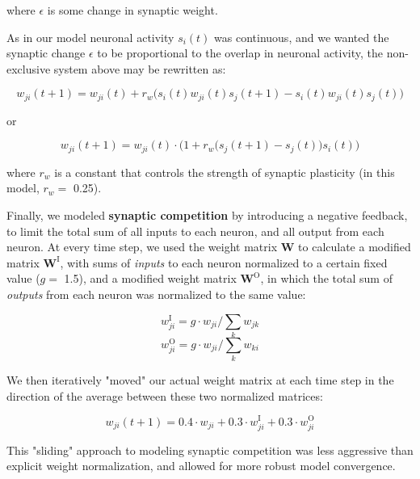\documentclass{article}
\begin{document}
where $\epsilon$ is some change in synaptic weight. 

As in our model neuronal activity $s_i(t)$ was continuous, and we wanted the synaptic change $\epsilon$ to be proportional to the overlap in neuronal activity, the non-exclusive system above may be rewritten as:

\[ w_{ji}(t+1) = w_{ji}(t) + r_w \big(s_i(t)w_{ji}(t)s_j(t+1) - s_i(t)w_{ji}(t)s_j(t)\big) \]

or

\[ w_{ji}(t+1) = w_{ji}(t)\cdot\Big(1+r_w\big(s_j(t+1)-s_j(t)\big)s_i(t)\Big) \]

where $r_w$ is a constant that controls the strength of synaptic plasticity (in this model, $r_w=$ 0.25).

Finally, we modeled \textbf{synaptic competition} by introducing a negative feedback, to limit the total sum of all inputs to each neuron, and all output from each neuron. At every time step, we used the weight matrix $\mathbf{W}$ to calculate a modified matrix $\mathbf{W}^\text{I}$, with sums of \textit{inputs} to each neuron normalized to a certain fixed value ($g=$ 1.5), and a modified weight matrix $\mathbf{W}^\text{O}$, in which the total sum of \textit{outputs} from each neuron was normalized to the same value: 

\[ w_{ji}^\text{I} = g \cdot w_{ji}/\sum_k{w_{jk}} \]
\[ w_{ji}^\text{O} = g \cdot w_{ji}/\sum_k{w_{ki}} \]

We then iteratively "moved" our actual weight matrix at each time step in the direction of the average between these two normalized matrices:

\[ w_{ji}(t+1) = 0.4 \cdot w_{ji} + 0.3 \cdot w^\text{I}_{ji} + 0.3 \cdot w^\text{O}_{ji} \]

This "sliding" approach to modeling synaptic competition was less aggressive than explicit weight normalization, and allowed for more robust model convergence.
\end{document}
